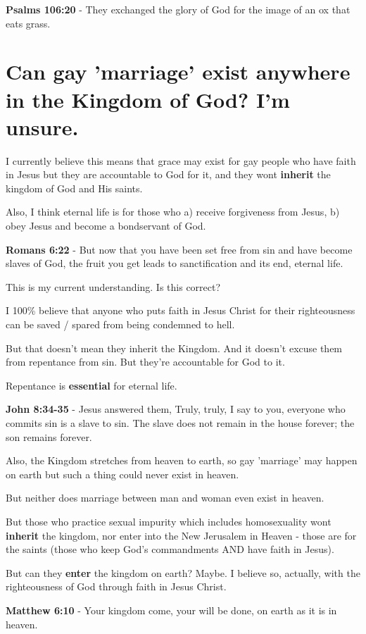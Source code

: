 \documentclass[11pt]{article}
\begin{document}
\textbf{Psalms 106:20} - They exchanged the glory of God for the image of an ox that eats grass.􂉢

\section{Can gay 'marriage' exist anywhere in the Kingdom of God? I'm unsure.}
\label{sec:org7294d92}
I currently believe this means that grace may
exist for gay people who have faith in Jesus
but they are accountable to God for it, and
they wont \textbf{inherit} the kingdom of God and His saints.

Also, I think eternal life is for those who a) receive forgiveness from Jesus, b) obey Jesus and become a bondservant of God.

\textbf{Romans 6:22} - But now that you have been set free from sin and have become slaves of God, the fruit you get leads to sanctification and its end, eternal life.

This is my current understanding. Is this correct?

I 100\% believe that anyone who puts faith in Jesus Christ for their righteousness can be saved / spared from being condemned to hell.

But that doesn't mean they inherit the Kingdom.
And it doesn't excuse them from repentance from sin.
But they're accountable for God to it.

Repentance is \textbf{essential} for eternal life.

\textbf{John 8:34-35} - Jesus answered them, Truly, truly, I say to you, everyone who commits sin is a slave to sin. The slave does not remain in the house forever; the son remains forever.

Also, the Kingdom stretches from heaven to earth, so gay 'marriage' may happen on earth but such a thing could never exist in heaven.

But neither does marriage between man and woman even exist in heaven.

But those who practice sexual impurity which includes homosexuality wont \textbf{inherit} the kingdom, nor enter into the New Jerusalem in Heaven - those are for the saints (those who keep God's commandments AND have faith in Jesus).

But can they \textbf{enter} the kingdom on earth? Maybe. I believe so, actually, with the righteousness of God through faith in Jesus Christ.

\textbf{Matthew 6:10} - Your kingdom come, your will be done, on earth as it is in heaven.
\end{document}
